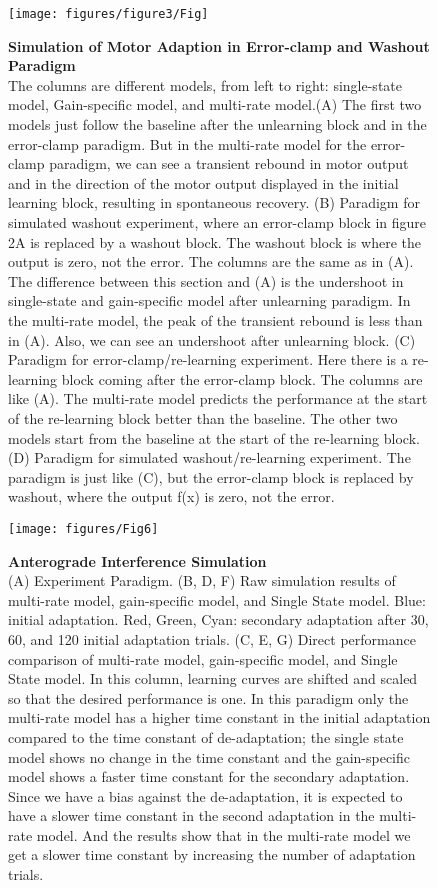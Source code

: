 \documentclass[9pt,twocolumn]{paper-template}
\begin{document}
\begin{figure*}[h!]
  \centering
    \texttt{[image: figures/figure3/Fig]}
  \caption{\textbf{ Simulation of Motor Adaption in Error-clamp and Washout Paradigm}\\
The columns are different models, from left to right: single-state model, Gain-specific model, and multi-rate model.(A) The first two models just follow the baseline after the unlearning block and in the error-clamp paradigm. But in the multi-rate model for the error-clamp paradigm, we can see a transient rebound in motor output and in the direction of the motor output displayed in the initial learning block, resulting in spontaneous recovery.
(B) Paradigm for simulated washout experiment, where an error-clamp block in figure 2A is replaced by a washout block. The washout block is where the output is zero, not the error. The columns are the same as in (A). The difference between this section and (A) is the undershoot in single-state and gain-specific model after unlearning paradigm. In the multi-rate model, the peak of the transient rebound is less than in (A). Also, we can see an undershoot after unlearning block.
(C) Paradigm for error-clamp/re-learning experiment. Here there is a re-learning block coming after the error-clamp block. The columns are like (A). The multi-rate model predicts the performance at the start of the re-learning block better than the baseline. The other two models start from the baseline at the start of the re-learning block. 
(D) Paradigm for simulated washout/re-learning experiment. The paradigm is just like (C), but the error-clamp block is replaced by washout, where the output f(x) is zero, not the error.
}
  \label{fig:error_clamp}
\end{figure*}


\begin{figure}[h!]
  \centering
     \texttt{[image: figures/Fig6]}
  \caption{\textbf{Anterograde Interference Simulation}\\(A)  Experiment Paradigm. (B, D, F) Raw simulation results of multi-rate model, gain-specific model, and Single State model. Blue: initial adaptation. Red, Green, Cyan: secondary adaptation after 30, 60, and 120 initial adaptation trials. (C, E, G) Direct performance comparison of multi-rate model, gain-specific model, and Single State model. In this column, learning curves are shifted and scaled so that the desired performance is one. In this paradigm only the multi-rate model has a higher time constant in the initial adaptation compared to the time constant of de-adaptation; the single state model shows no change in the time constant and the gain-specific model shows a faster time constant for the secondary adaptation. Since we have a bias against the de-adaptation, it is expected to have a slower time constant in the second adaptation in the multi-rate model. And the results show that in the multi-rate model we get a slower time constant by increasing the number of adaptation trials. 
}
  \label{fig:Anterograde_Interference_Simulation}
\end{figure}
\end{document}
